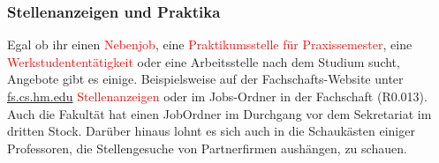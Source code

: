 \subsubsection{Stellenanzeigen und Praktika}
Egal ob ihr einen \textcolor{red}{Nebenjob}, eine \textcolor{red}{Praktikumsstelle für Praxissemester}, 
eine \textcolor{red}{Werkstudententätigkeit} oder eine Arbeitsstelle nach dem 
Studium sucht, Angebote gibt es einige. Beispielsweise auf der 
Fachschafts-Website unter \url{fs.cs.hm.edu}  \textcolor{red}{Stellenanzeigen} oder im 
Jobs-Ordner in der Fachschaft (R0.013). Auch die Fakultät hat einen JobOrdner im Durchgang vor dem Sekretariat im dritten Stock. Darüber 
hinaus lohnt es sich auch in die Schaukästen einiger Professoren, die 
Stellengesuche von Partnerfirmen aushängen, zu schauen. 